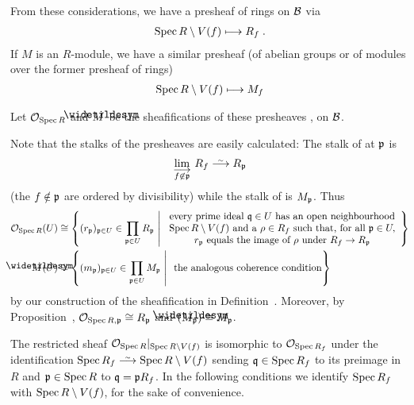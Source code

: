 \documentclass[a4paper,parskip=half,numbers=enddot, DIV=12]{scrreprt}
\begin{document}
From these considerations, we have a presheaf of rings on $\mathcal{B}$ via
\begin{align}\lbl{eq:SpecRingLoc}
    \Spec R\setminus V(f) \longmapsto R_f\;.
\end{align}
If $M$ is an $R$-module, we have a similar presheaf (of abelian groups or of modules over the former presheaf of rings)
\begin{align} \lbl{eq:SpecModuleLoc}
    \Spec R\setminus V(f) \longmapsto M_f
\end{align}
\begin{defi}
    Let $\mathcal{O}_{\operatorname{Spec} R}$ and $\snake M$ be the sheafifications of these presheaves ,  on $\mathcal{B}$.
\end{defi}
\begin{rem*}
    Note that the stalks of the presheaves are easily calculated: The stalk of  at $\mathfrak{p}$ is 
    \begin{align*}
        \colimit[f\not \in \pp] R_f \isomorphism R_\pp
    \end{align*}
    (the $f\notin\mathfrak{p}$ are ordered by divisibility) while the stalk of  is $M_{\mathfrak{p}}$. Thus
    \begin{align*}
        \Oo_{\Spec R}(U) &\cong \left\{(r_\pp)_{\pp\in U}\in \prod_{\pp\in U} R_\pp \st
        \begin{array}{c}
	         \text{every prime ideal } \qq\in U \text{ has an open neighbourhood}\\
	         \Spec R\setminus V(f) \text{ and a } \rho \in R_f\text{ such that, for all }\pp\in U,
	          \\r_\pp\text{ equals the image of } \rho \text{ under } R_f\morphism R_\pp
        \end{array}\right\}\\        
        \snake M(U) &\cong \left\{(m_\pp)_{\pp\in U}\in \prod_{\pp\in U} M_\pp \st\text{ the analogous coherence condition}\right\}
    \end{align*}
    by our construction of the sheafification in Definition~. Moreover, by Proposition~, $\mathcal{O}_{\operatorname{Spec} R,\mathfrak{p}}\cong R_{\mathfrak{p}}$ and $(\snake M_\pp)\cong M_\pp$.
\end{rem*}
\begin{fact}
    The restricted sheaf $\mathcal{O}_{\operatorname{Spec} R}|_{\operatorname{Spec} R\setminus V(f)}$ is isomorphic to $\mathcal{O}_{\operatorname{Spec} R_f}$ under the identification $\Spec R_f\isomorphism \Spec R\setminus V(f)$ sending $\mathfrak{q}\in \operatorname{Spec} R_f$ to its preimage in $R$ and $\mathfrak{p}\in \operatorname{Spec} R$ to $\mathfrak{q} = \mathfrak{p} R_f$. In the following conditions we identify $\operatorname{Spec} R_f$ with $\operatorname{Spec} R\setminus V(f)$, for the sake of convenience.
\end{fact}
\end{document}
